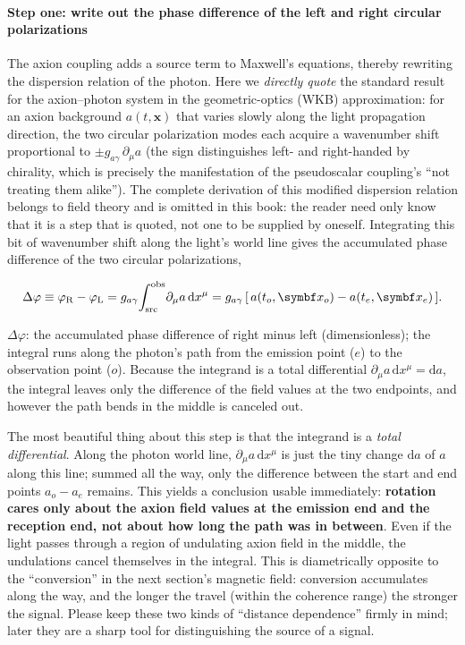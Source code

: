 \paragraph{Step one: write out the phase difference of the left and right circular polarizations}

The axion coupling adds a source term to Maxwell's equations, thereby rewriting the dispersion relation of the photon. Here we \emph{directly quote} the standard result for the axion--photon system in the geometric-optics (WKB) approximation: for an axion background \(a(t,\bm x)\) that varies slowly along the light propagation direction, the two circular polarization modes each acquire a wavenumber shift proportional to \(\pm g_{a\gamma}\,\partial_\mu a\) (the sign distinguishes left- and right-handed by chirality, which is precisely the manifestation of the pseudoscalar coupling's ``not treating them alike''). The complete derivation of this modified dispersion relation belongs to field theory and is omitted in this book: the reader need only know that it is a step that is quoted, not one to be supplied by oneself. Integrating this bit of wavenumber shift along the light's world line gives the accumulated phase difference of the two circular polarizations,

\begin{equation}
  \Delta\varphi \equiv \varphi_{\mathrm R}-\varphi_{\mathrm L}
  = g_{a\gamma}\!\int_{\rm src}^{\rm obs}\! \partial_\mu a\,\mathrm dx^\mu
  = g_{a\gamma}\,[\,a(t_o,\bm x_o)-a(t_e,\bm x_e)\,].
  \label{eq:e22-phase-diff}
\end{equation}
\begin{formulaexplain}
\(\Delta\varphi\): the accumulated phase difference of right minus left (dimensionless); the integral runs along the photon's path from the emission point (\(e\)) to the observation point (\(o\)). Because the integrand is a total differential \(\partial_\mu a\,\mathrm dx^\mu=\mathrm da\), the integral leaves only the difference of the field values at the two endpoints, and however the path bends in the middle is canceled out.
\end{formulaexplain}

The most beautiful thing about this step is that the integrand is a \emph{total differential}. Along the photon world line, \(\partial_\mu a\,\mathrm dx^\mu\) is just the tiny change \(\mathrm da\) of \(a\) along this line; summed all the way, only the difference between the start and end points \(a_o-a_e\) remains. This yields a conclusion usable immediately: \textbf{rotation cares only about the axion field values at the emission end and the reception end, not about how long the path was in between}. Even if the light passes through a region of undulating axion field in the middle, the undulations cancel themselves in the integral. This is diametrically opposite to the ``conversion'' in the next section's magnetic field: conversion accumulates along the way, and the longer the travel (within the coherence range) the stronger the signal. Please keep these two kinds of ``distance dependence'' firmly in mind; later they are a sharp tool for distinguishing the source of a signal.

